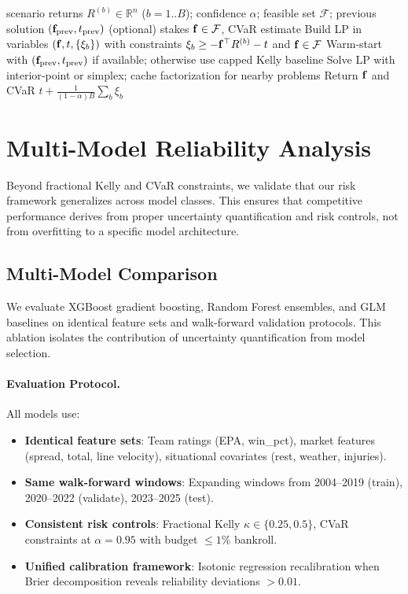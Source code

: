 \begin{algorithm}[t]
  \caption{CVaR Stake Sizing with Warm Starts}
  \label{alg:cvar-solve}
  \begin{algorithmic}[1]
    \Require scenario returns $R^{(b)}\in\mathbb{R}^n$ ($b=1..B$); confidence $\alpha$; feasible set $\mathcal F$; previous solution $(\mathbf{f}_{\text{prev}},t_{\text{prev}})$ (optional)
    \Ensure stakes $\mathbf{f}\in\mathcal F$, CVaR estimate
    \State Build LP in variables $(\mathbf{f},t,\{\xi_b\})$ with constraints $\xi_b\ge-\mathbf{f}^\top R^{(b)}-t$ and $\mathbf{f}\in\mathcal F$
    \State Warm‑start with $(\mathbf{f}_{\text{prev}},t_{\text{prev}})$ if available; otherwise use capped Kelly baseline
    \State Solve LP with interior‑point or simplex; cache factorization for nearby problems
    \State Return $\mathbf{f}$ and CVaR $t+\frac{1}{(1-\alpha)B}\sum_b \xi_b$
  \end{algorithmic}
\end{algorithm}

\section{Multi-Model Reliability Analysis}\label{sec:multi-model-reliability}
Beyond fractional Kelly and CVaR constraints, we validate that our risk framework generalizes across model classes. This ensures that competitive performance derives from proper uncertainty quantification and risk controls, not from overfitting to a specific model architecture.

\subsection{Multi-Model Comparison}\label{subsec:multi-model-comparison}
We evaluate XGBoost gradient boosting, Random Forest ensembles, and GLM baselines on identical feature sets and walk-forward validation protocols. This ablation isolates the contribution of uncertainty quantification from model selection.

\paragraph{Evaluation Protocol.}
All models use:
\begin{itemize}
  \item \textbf{Identical feature sets}: Team ratings (EPA, win\_pct), market features (spread, total, line velocity), situational covariates (rest, weather, injuries).
  \item \textbf{Same walk-forward windows}: Expanding windows from 2004--2019 (train), 2020--2022 (validate), 2023--2025 (test).
  \item \textbf{Consistent risk controls}: Fractional Kelly $\kappa \in \{0.25, 0.5\}$, CVaR constraints at $\alpha=0.95$ with budget $\le 1\%$ bankroll.
  \item \textbf{Unified calibration framework}: Isotonic regression recalibration when Brier decomposition reveals reliability deviations $>0.01$.
\end{itemize}

